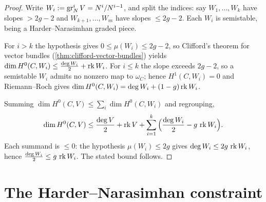 \begin{proof}
  Write $W_i := \operatorname{gr}^i_N V = N^i / N^{i-1}$, and split the indices: say
  $W_1, \ldots, W_k$ have slopes $> 2g - 2$ and $W_{k+1}, \ldots, W_m$ have slopes
  $\leq 2g - 2$. Each $W_i$ is semistable, being a Harder--Narasimhan graded piece.

  For $i > k$ the hypothesis gives $0 \leq \mu(W_i) \leq 2g - 2$, so Clifford's
  theorem for vector bundles (\cref{thm:clifford-vector-bundles}) yields
  $\dim H^0(C, W_i) \leq \tfrac{\deg W_i}{2} + \operatorname{rk} W_i$. For $i \leq k$ the slope
  exceeds $2g - 2$, so a semistable $W_i$ admits no nonzero map to $\omega_C$;
  hence $H^1(C, W_i) = 0$ and Riemann--Roch gives
  $\dim H^0(C, W_i) = \deg W_i + (1-g)\operatorname{rk} W_i$.

  Summing $\dim H^0(C, V) \leq \sum_i \dim H^0(C, W_i)$ and regrouping,
  \[
    \dim H^0(C, V) \leq \frac{\deg V}{2} + \operatorname{rk} V
      + \sum_{i=1}^k \Big( \frac{\deg W_i}{2} - g\,\operatorname{rk} W_i \Big).
  \]
  Each summand is $\leq 0$: the hypothesis $\mu(W_i) \leq 2g$ gives
  $\deg W_i \leq 2g\,\operatorname{rk} W_i$, hence $\tfrac{\deg W_i}{2} \leq g\,\operatorname{rk} W_i$. The
  stated bound follows.
\end{proof}

\section{The Harder--Narasimhan constraint}

